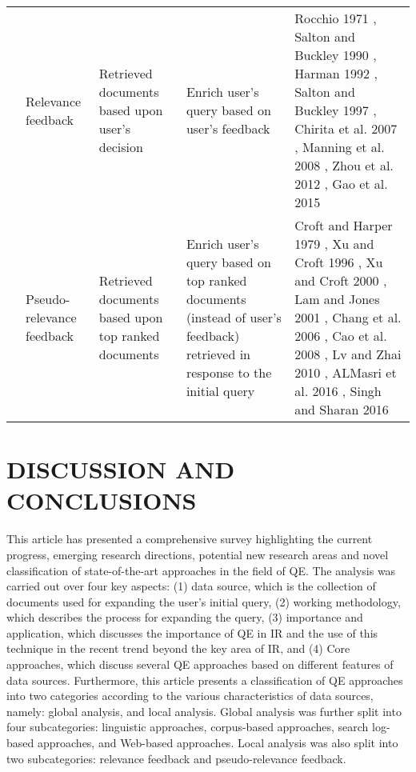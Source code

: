 \begin{table}[!h]
{\begin{tabular}{ | M{1.6cm} | M{2.0cm} | M{2.2cm} |M{2.7cm}| M{3.9cm} | }
			 & Relevance feedback & Retrieved documents based upon user's decision & Enrich user's query based on user's feedback & Rocchio  1971 \cite{rocchio1971relevance}, Salton and Buckley 1990 \cite{Salton90improvingretrieval}, Harman 1992 \cite{harman1992relevance}, Salton and Buckley 1997 \cite{salton1997improving}, Chirita et al. 2007 \cite{chirita2007personalized}, Manning et al. 2008 \cite{Manning:2008:IIR:1394399}, Zhou et al. 2012 \cite{zhou2012improving}, Gao et al. 2015 \cite{gao2015pattern}  \\  & Pseudo-relevance feedback & Retrieved documents based upon top ranked documents & Enrich user's query based on top ranked documents (instead of user's feedback) retrieved in response to the initial query  & Croft and Harper 1979 \cite{croft1979using}, Xu and Croft 1996 \cite{xu1996query}, Xu and Croft 2000 \cite{xu2000improving}, Lam and Jones 2001 \cite{lam2001applying}, Chang et al. 2006 \cite{chang2006query}, Cao et al. 2008 \cite{cao2008selecting}, Lv and Zhai 2010 \cite{lv2010positional}, ALMasri et al. 2016 \cite{almasri2016comparison}, Singh and Sharan 2016 \cite{singh2016new}
			\\ \hline
			
			
	\end{tabular}}
\end{table}


\section{DISCUSSION AND CONCLUSIONS}
\label{sec5}
This article has presented a comprehensive survey highlighting the current progress, emerging research directions, potential new research areas and novel classification of state-of-the-art approaches in the field of QE. The analysis was carried out over four key aspects: (1) data source, which is the collection of documents used for expanding the user's initial query, (2) working methodology, which describes the process for expanding the query, (3) importance and application, which discusses the importance of QE in IR and the use of this technique in the recent trend beyond the key area of IR, and (4) Core approaches, which discuss several QE approaches based on different features of data sources. Furthermore, this article presents a classification of QE approaches into two categories according to the various characteristics of data sources, namely: global analysis, and local analysis. Global analysis was further split into four subcategories: linguistic approaches, corpus-based approaches, search log-based approaches, and Web-based approaches. Local analysis was also split into two subcategories: relevance feedback and pseudo-relevance feedback.  


